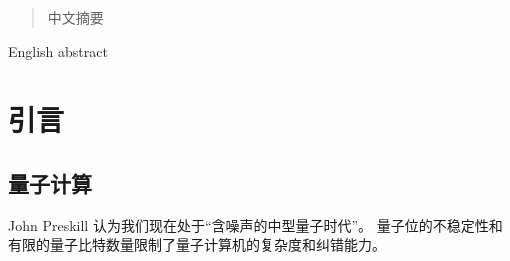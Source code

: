 \documentclass[
  ]{njuthesis}
\begin{document}

\maketitle


\begin{abstract}
  中文摘要
\end{abstract}

\begin{abstract*}
  English abstract
\end{abstract*}

\tableofcontents

\mainmatter


%   
%   

\chapter{引言}

\section{量子计算}

John Preskill 认为我们现在处于“含噪声的中型量子时代”。\cite{preskill2018}
量子位的不稳定性和有限的量子比特数量限制了量子计算机的复杂度和纠错能力。
\end{document}
